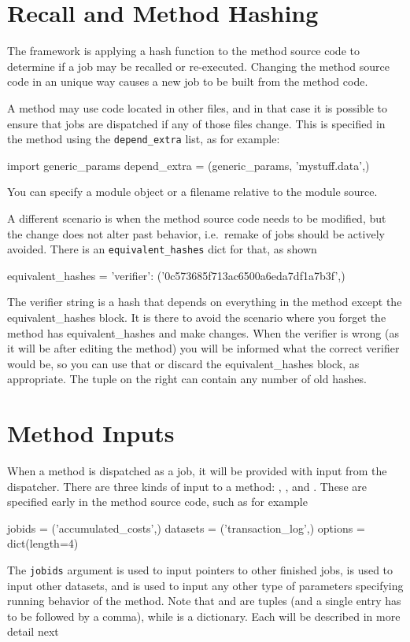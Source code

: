 \section{Recall and Method Hashing}

The framework is applying a hash function to the method source code to
determine if a job may be recalled or re-executed.  Changing the
method source code in an unique way causes a new job to be built from
the method code.

A method may use code located in other files, and in that case it is
possible to ensure that jobs are dispatched if any of those files
change.  This is specified in the method using the
\texttt{depend\_extra} list, as for example:
\begin{python}
import generic_params
depend_extra = (generic_params, 'mystuff.data',)
\end{python}
You can specify a module object or a filename relative to the module
source.

A different scenario is when the method source code needs to be
modified, but the change does not alter past behavior, i.e.\ remake of
jobs should be actively avoided.  There is an
\texttt{equivalent\_hashes} dict for that, as shown
\begin{python}
  equivalent_hashes = {'verifier': ('0c573685f713ac6500a6eda7df1a7b3f',)}
\end{python}

The verifier string is a hash that depends on everything in the method
except the equivalent\_hashes block. It is there to avoid the scenario
where you forget the method has equivalent\_hashes and make changes. When
the verifier is wrong (as it will be after editing the method) you will be
informed what the correct verifier would be, so you can use that or discard
the equivalent\_hashes block, as appropriate. The tuple on the right can
contain any number of old hashes.



\section{Method Inputs}

When a method is dispatched as a job, it will be provided with input
from the dispatcher.  There are three kinds of input to a method:
\jobids, \datasets, and \options.  These are specified early in the
method source code, such as for example
\begin{python}
jobids = ('accumulated_costs',)
datasets = ('transaction_log',)
options = dict(length=4)
\end{python}
The \texttt{jobids} argument is used to input pointers to other
finished jobs, \datasets is used to input other datasets, and \options
is used to input any other type of parameters specifying running
behavior of the method.  Note that \jobids and \datasets are tuples
(and a single entry has to be followed by a comma), while \options is
a dictionary.  Each will be described in more detail next



